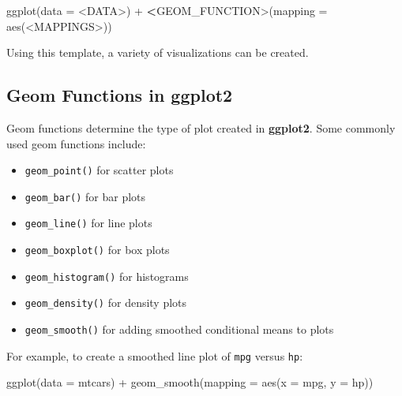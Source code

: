 \documentclass[
  11pt,
]{book}
\makeatletter
\newenvironment{Shaded}{}{}
\newcommand{\AttributeTok}[1]{#1}
\newcommand{\ErrorTok}[1]{\textcolor[rgb]{0.21,0.21,0.21}{\textbf{#1}}}
\newcommand{\FunctionTok}[1]{#1}
\newcommand{\NormalTok}[1]{#1}
\newcommand{\SpecialCharTok}[1]{\textcolor[rgb]{0.39,0.39,0.39}{#1}}
\providecommand{\tightlist}{%
  \setlength{\itemsep}{0pt}\setlength{\parskip}{0pt}}
\newenvironment{kframe}{%
\medskip{}
\setlength{\fboxsep}{.8em}
 \def\at@end@of@kframe{}%
 \ifinner\ifhmode%
  \def\at@end@of@kframe{\end{minipage}}%
  \begin{minipage}{\columnwidth}%
 \fi\fi%
 \def\FrameCommand##1{\hskip\@totalleftmargin \hskip-\fboxsep
 \colorbox{shadecolor}{##1}\hskip-\fboxsep
     \hskip-\linewidth \hskip-\@totalleftmargin \hskip\columnwidth}%
 \MakeFramed {\advance\hsize-\width
   \@totalleftmargin\z@ \linewidth\hsize
   \@setminipage}}%
 {\par\unskip\endMakeFramed%
 \at@end@of@kframe}
\renewenvironment{Shaded}{\begin{kframe}}{\end{kframe}}
\theoremstyle{definition}
\theoremstyle{definition}
\theoremstyle{definition}
\theoremstyle{definition}
\theoremstyle{remark}
\makeatother
\begin{document}
\begin{Shaded}
\begin{Highlighting}[]
\FunctionTok{ggplot}\NormalTok{(}\AttributeTok{data =} \SpecialCharTok{\textless{}}\NormalTok{DATA}\SpecialCharTok{\textgreater{}}\NormalTok{) }\SpecialCharTok{+}
  \ErrorTok{\textless{}}\NormalTok{GEOM\_FUNCTION}\SpecialCharTok{\textgreater{}}\NormalTok{(}\AttributeTok{mapping =} \FunctionTok{aes}\NormalTok{(}\SpecialCharTok{\textless{}}\NormalTok{MAPPINGS}\SpecialCharTok{\textgreater{}}\NormalTok{))}
\end{Highlighting}
\end{Shaded}

Using this template, a variety of visualizations can be created.

\subsection*{Geom Functions in ggplot2}\label{geom-functions-in-ggplot2}


Geom functions determine the type of plot created in \textbf{ggplot2}. Some commonly used geom functions include:

\begin{itemize}
\tightlist
\item
  \texttt{geom\_point()} for scatter plots\\
\item
  \texttt{geom\_bar()} for bar plots\\
\item
  \texttt{geom\_line()} for line plots\\
\item
  \texttt{geom\_boxplot()} for box plots\\
\item
  \texttt{geom\_histogram()} for histograms\\
\item
  \texttt{geom\_density()} for density plots\\
\item
  \texttt{geom\_smooth()} for adding smoothed conditional means to plots
\end{itemize}

For example, to create a smoothed line plot of \texttt{mpg} versus \texttt{hp}:

\begin{Shaded}
\begin{Highlighting}[]
\FunctionTok{ggplot}\NormalTok{(}\AttributeTok{data =}\NormalTok{ mtcars) }\SpecialCharTok{+}
  \FunctionTok{geom\_smooth}\NormalTok{(}\AttributeTok{mapping =} \FunctionTok{aes}\NormalTok{(}\AttributeTok{x =}\NormalTok{ mpg, }\AttributeTok{y =}\NormalTok{ hp))}
\end{Highlighting}
\end{Shaded}
\end{document}
